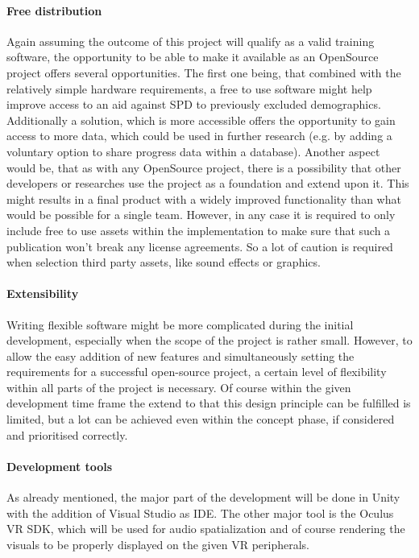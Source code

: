 \documentclass[a4paper,11pt]{article}%
\renewcommand{\\}{\vspace*{0.5\baselineskip} \newline}
\begin{document}
\paragraph{Free distribution} Again assuming the outcome of this project will qualify as a valid training software, the opportunity to be able to make it available as an OpenSource project offers several opportunities. The first one being, that combined with the relatively simple hardware requirements, a free to use software might help improve access to an aid against \ac{SPD} to previously excluded demographics. Additionally a solution, which is more accessible offers the opportunity to gain access to more data, which could be used in further research (e.g. by adding a voluntary option to share progress data within a database). Another aspect would be, that as with any OpenSource project, there is a possibility that other developers or researches use the project as a foundation and extend upon it. This might results in a final product with a widely improved functionality than what would be possible for a single team. However, in any case it is required to only include free to use assets within the implementation to make sure that such a publication won't break any license agreements. So a lot of caution is required when selection third party assets, like sound effects or graphics.


\paragraph{Extensibility} Writing flexible software might be more complicated during the initial development, especially when the scope of the project is rather small. However, to allow the easy addition of new features and simultaneously setting the requirements for a successful open-source project, a certain level of flexibility within all parts of the project is necessary. Of course within the given development time frame the extend to that this design principle can be fulfilled is limited, but a lot can be achieved even within the concept phase, if considered and prioritised correctly.


\paragraph{Development tools} As already mentioned, the major part of the development will be done in Unity with the addition of Visual Studio as \ac{IDE}. The other major tool is the Oculus \ac{VR} \ac{SDK}, which will be used for audio spatialization and of course rendering the visuals to be properly displayed on the given \ac{VR} peripherals.
\end{document}

